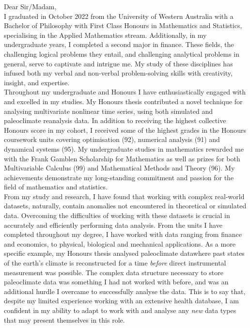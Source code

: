 \documentclass[11pt,a4paper,roman]{moderncv}
\begin{document}
Dear Sir/Madam,
\vspace{1em}
\\
I graduated in October 2022 from the University of Western Australia with a Bachelor of Philosophy with First Class Honours in Mathematics and Statistics, specialising in the Applied Mathematics stream. Additionally, in my undergraduate years, I completed a second major in finance. These fields, the challenging logical problems they entail, and challenging analytical problems in general, serve to captivate and intrigue me. My study of these disciplines has infused both my verbal and non-verbal problem-solving skills with creativity, insight, and expertise.
\vspace{1em}
\\
Throughout my undergraduate and Honours I have enthusiastically engaged with and excelled in my studies. My Honours thesis contributed a novel technique for analysing multivariate nonlinear time series, using both simulated and paleoclimate reanalysis data. In addition to receiving the highest collective Honours score in my cohort, I received some of the highest grades in the Honours coursework units covering optimisation (92), numerical analysis (91) and dynamical systems (95). My undergraduate studies in mathematics rewarded me with the Frank Gamblen Scholarship for Mathematics as well as prizes for both Multivariable Calculus (99) and Mathematical Methods and Theory (96). My achievements demonstrate my long-standing commitment and passion for the field of mathematics and statistics.  
\vspace{1em}
\\
From my study and research, I have found that working with complex real-world datasets, naturally, contain anomalies not encountered in theoretical or simulated data. Overcoming the difficulties of working with these datasets is crucial in accurately and efficiently performing data analysis. From the units I have completed throughout my degree, I have worked with data ranging from finance and economics, to physical, biological and mechanical applications. As a more specific example, my Honours thesis analysed paleoclimate data\textendash where past states of the earth's climate is reconstructed for a time \emph{before} direct instrumental measurement was possible. The complex data structure necessary to store paleoclimate data was something I had not worked with before, and was an additional hurdle I overcame to successfully analyse the data. This is to say that, despite my limited experience working with an extensive health database, I am confident in my ability to adapt to work with and analyse any \emph{new} data types that may present themselves in this role.
\end{document}

